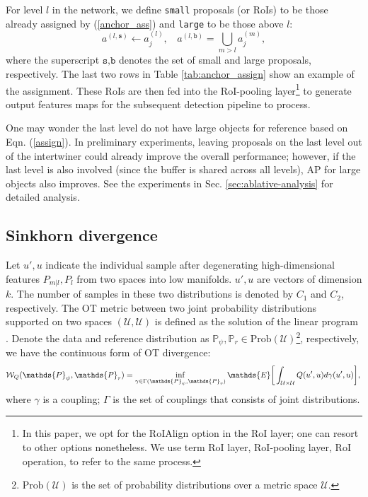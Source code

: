 \documentclass{article} \usepackage{iclr2019_conference,times}
\begin{document}
For  level $l$ in the network, we define \texttt{small} proposals (or RoIs) to be those already assigned by (\ref{anchor_ass}) and \texttt{large} to be those above $l$:
\vspace{-.1cm}
\begin{equation}
a^{(l, \texttt{s})} \leftarrow a_j^{(l)},~~~~a^{(l, \texttt{b})} = \bigcup_{m>l} a_j^{(m)}, \label{assign}
\end{equation}
where the superscript $\texttt{s,b}$ denotes the set of small and large proposals, respectively.
The last two rows in Table \ref{tab:anchor_assign} show an example of the assignment.
These RoIs are then fed into the RoI-pooling layer\footnote{In this paper, we opt for the RoIAlign \citep{he2017_mask_rcnn} option in the RoI layer; one can resort to other options nonetheless. We use term RoI layer, RoI-pooling layer, RoI operation, to refer to the same process.} to generate output features maps for the subsequent detection pipeline to process. 

One may wonder the last level do not have large objects for reference based on Eqn. (\ref{assign}). 
In preliminary experiments, leaving proposals on the last level out of the intertwiner could already improve the overall performance; however, if the last level is also involved (since the buffer is shared across all levels), AP for large objects also improves. 
See the experiments in Sec. \ref{sec:ablative-analysis} for detailed analysis. 

\subsection{Sinkhorn divergence}\label{sec:sinkhorn-divergence}

Let $u', u$ indicate the individual sample after degenerating high-dimensional features $P_{m|l}, P_l$ from two spaces into low manifolds.
$u', u$ are vectors of dimension $k$. The number of samples in these two distributions is denoted by $C_1$ and $C_2$, respectively.
The OT metric between two joint probability distributions supported
on two  spaces $(\mathcal{U}, \mathcal{U})$ is defined as the solution of the linear program \citep{cuturi2013_regularized_OT}. Denote the data and reference distribution as
$\mathds{P}_\psi, \mathds{P}_r \in \text{Prob}(\mathcal{U})$\footnote{$\text{Prob}(\mathcal{U})$ is the set of probability distributions over a metric space $\mathcal{U}$.}, respectively, we have the continuous form of OT divergence: \begin{equation}
\mathcal{W}_{Q}(  \mathds{P}_\psi, \mathds{P}_r  )= 
\inf_{\gamma \in \Gamma(\mathds{P}_\psi, \mathds{P}_r   )}
\mathds{E} \bigg[ \int_{    
	\mathcal{U} \times \mathcal{U}
} Q(u', u) d \gamma(u', u)  \bigg], \label{ot_loss} \\
\end{equation}
where $\gamma$ is a coupling; $\Gamma$ is the set of couplings that consists of joint distributions.
\end{document}
